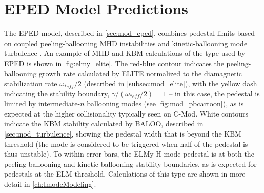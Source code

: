 
\section{EPED Model Predictions}\label{sec:elmy_eped}

The EPED model, described in \cref{sec:mod_eped}, combines pedestal limits based on coupled peeling-ballooning MHD instabilities \cite{Snyder2004,Wilson2002,Wilson2006} and kinetic-ballooning mode turbulence \cite{Snyder2001}.  An example of MHD and KBM calculations of the type used by EPED is shown in \cref{fig:elmy_elite}.  The red-blue contour indicates the peeling-ballooning growth rate calculated by ELITE normalized to the diamagnetic stabilization rate $\omega_{*eff}/2$ (described in \cref{subsec:mod_elite}), with the yellow dash indicating the stability boundary, $\gamma/(\omega_{*eff}/2) = 1$ -- in this case, the pedestal is limited by intermediate-$n$ ballooning modes (see \cref{fig:mod_pbcartoon}), as is expected at the higher collisionality typically seen on C-Mod.  White contours indicate the KBM stability calculated by BALOO, described in \cref{sec:mod_turbulence}, showing the pedestal width that is beyond the KBM threshold (the mode is considered to be triggered when half of the pedestal is thus unstable).  To within error bars, the ELMy H-mode pedestal is at both the peeling-ballooning and kinetic-ballooning stability boundaries, as is expected for pedestals at the ELM threshold.  Calculations of this type are shown in more detail in \cref{ch:ImodeModeling}.

